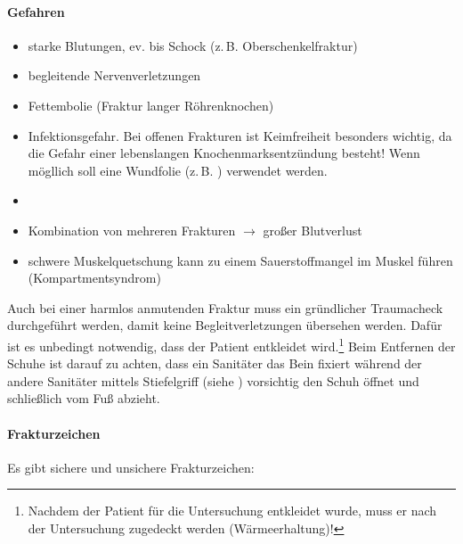 \paragraph{Gefahren}
\begin{itemize}
  \item starke Blutungen, ev. bis Schock (z.\,B. Oberschenkelfraktur)
  \item begleitende Nervenverletzungen
  \item Fettembolie (Fraktur langer Röhrenknochen)
  \item Infektionsgefahr. Bei offenen Frakturen ist Keimfreiheit be\-sonders 
  wichtig, da  die Gefahr einer lebenslangen Knochen\-marks\-ent\-zündung 
   besteht!
  Wenn mögllich soll eine Wundfolie (z.\,B.
  \texttrademark ) verwendet werden.    \item
  \item Kombination von mehreren Frakturen $\rightarrow$ großer Blutverlust
  \item schwere Muskelquetschung kann zu einem Sauerstoffmangel im Muskel 
  führen (Kompartmentsyndrom)
\end{itemize}

Auch bei einer harmlos anmutenden Fraktur muss ein gründlicher Traumacheck
durchgeführt werden, damit keine Begleitverletzungen übersehen werden. Dafür
ist es unbedingt notwendig, dass der Patient entkleidet wird.\footnote{Nachdem
der Patient für die Untersuchung entkleidet wurde, muss er nach der
Untersuchung zugedeckt werden (Wärmeerhaltung)!} Beim Entfernen der Schuhe ist
darauf zu achten, dass ein Sanitäter das Bein fixiert während der andere
Sanitäter mittels Stiefelgriff (siehe )
vorsichtig den Schuh öffnet und schließlich vom Fuß abzieht.

\paragraph{Frakturzeichen} 
\label{topic:frakturzeichen}

Es gibt sichere und unsichere Frakturzeichen:

